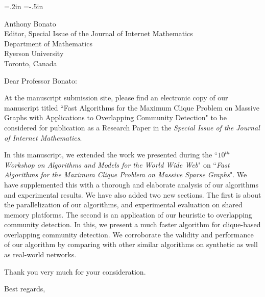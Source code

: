 
\oddsidemargin=0in %
\evensidemargin=.2in
\textwidth=6.5in
\topmargin=-.5in
\textheight=9in


\date{\today}



\begin{letter}{
Anthony Bonato \\
Editor, Special Issue of the Journal of Internet Mathematics  \\
Department of Mathematics \\
Ryerson University \\
Toronto, Canada
}

\opening{Dear Professor Bonato:}

At the manuscript submission site, please find an electronic copy of our manuscript titled
``Fast Algorithms for the Maximum Clique Problem on Massive Graphs with Applications to Overlapping Community Detection" to be considered for publication as a Research Paper in the 
{\em Special Issue of the Journal of Internet Mathematics}.

In this manuscript, we extended the work we presented during the ``{\em $10^{th}$ Workshop on Algorithms and Models for the World Wide Web}" on ``{\em Fast Algorithms for the Maximum Clique Problem on Massive Sparse Graphs}". We have supplemented this with a thorough and elaborate analysis of our algorithms and experimental results. We have also added two new sections. The first is about the parallelization of our algorithms, and experimental evaluation on shared memory platforms. The second is an application of our heuristic to overlapping community detection. In this, we present a much faster algorithm for clique-based overlapping community detection. We corroborate the validity and performance of our algorithm by comparing with other similar algorithms on synthetic as well as real-world networks.

Thank you very much for your consideration.

\closing{Best regards,}
\end{letter}






